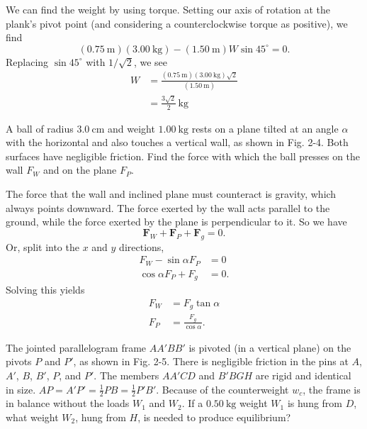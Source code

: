 \documentclass[../feynman-lectures-on-physics.tex]{subfiles}
\begin{document}
\begin{questions}
\begin{solution}
	We can find the weight by using torque. Setting our axis of rotation at the plank's pivot point (and considering a counterclockwise torque as positive), we find
	\[
	(\SI{0.75}{\meter})(\SI{3.00}{\kilo\gram}) - (\SI{1.50}{\meter})W\sin{45^\circ} = 0
	.\] 
	Replacing $\sin{45^\circ}$ with $1/\sqrt{2}$, we see
	\begin{align}
		W &= \frac{(\SI{0.75}{\meter})(\SI{3.00}{\kilo\gram})\sqrt{2}}{(\SI{1.50}{\meter})} \\
		  &= \frac{3\sqrt{2}}{2}\,\si{\kilo\gram}
	\end{align}
\end{solution}

\question A ball of radius $\SI{3.0}{\centi\meter}$ and weight $\SI{1.00}{\kilo\gram}$ rests on a plane tilted at an angle $\alpha$ with the horizontal and also touches a vertical wall, as shown in Fig. 2-4. Both surfaces have negligible friction. Find the force with which the ball presses on the wall $F_W$ and on the plane $F_P$.

\begin{solution}
	The force that the wall and inclined plane must counteract is gravity, which always points downward. The force exerted by the wall acts parallel to the ground, while the force exerted by the plane is perpendicular to it. So we have
	\[
	\mathbf{F}_{W} + \mathbf{F}_P + \mathbf{F}_g = 0.
	\] 
	Or, split into the $x$ and $y$ directions,
	\begin{align}
		F_{W} - \sin\alpha{F_P} &= 0 \\
		\cos\alpha{F_P} + F_g &= 0.
	\end{align}
	Solving this yields
	\begin{align}
		F_W &= F_g\tan\alpha \\
		F_P &= \frac{F_g}{\cos\alpha}.
	\end{align}
\end{solution}

\question The jointed parallelogram frame $AA'BB'$ is pivoted (in a vertical plane) on the pivots $P$ and $P'$, as shown in Fig. 2-5. There is negligible friction in the pins at $A$, $A'$, $B$, $B'$, $P$, and $P'$. The members $AA'CD$ and $B'BGH$ are rigid and identical in size. $AP=A'P'=\frac{1}{2}PB=\frac{1}{2}P'B'$. Because of the counterweight $w_c$, the frame is in balance without the loads $W_1$ and $W_2$. If a $\SI{0.50}{\kilo\gram}$ weight $W_1$ is hung from $D$, what weight $W_2$, hung from $H$, is needed to produce equilibrium?


\end{questions}
\end{document}
